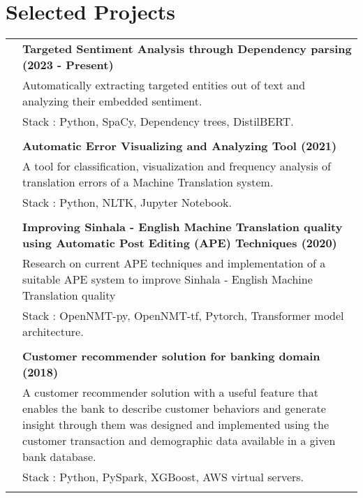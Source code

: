 \documentclass[a4paper,11pt]{article}
\begin{document}
\section{Selected Projects}
\begin{tabular}{r|p{17.5cm}}
\emph{} & \normalsize \bf Targeted Sentiment Analysis through Dependency  parsing (2023 - Present) \textsc{}  \\\textsc{}&\small{Automatically extracting targeted entities out of text and analyzing their embedded sentiment.}\\&\footnotesize{Stack : Python, SpaCy,  Dependency trees, DistilBERT.}\\\multicolumn{2}{c}{} \\

 \emph{} & \normalsize \bf Automatic Error Visualizing and Analyzing Tool (2021) \textsc{}  \\\textsc{}&\small{A tool for classification, visualization and frequency analysis of translation errors of a Machine Translation system.}\\&\footnotesize{Stack : Python, NLTK, Jupyter Notebook.}\\\multicolumn{2}{c}{} \\
 \emph{} & \normalsize \bf Improving Sinhala - English Machine Translation quality using Automatic Post Editing (APE) Techniques (2020)\textsc{}  \\\textsc{}&\small{Research  on current APE techniques and implementation of a suitable APE system to improve Sinhala - English Machine Translation quality}\\&\footnotesize{Stack : OpenNMT-py, OpenNMT-tf, Pytorch, Transformer model architecture.}\\\multicolumn{2}{c}{} \\
 

 \textsc{} & \normalsize \bf Customer recommender solution for banking domain (2018) \\&\small {A customer recommender solution with a useful feature that enables the bank to describe customer behaviors and generate insight through them was designed and implemented using the customer transaction and demographic data available in a given bank database. }\\&\footnotesize{Stack : Python, PySpark, XGBoost, AWS virtual servers.}\\\multicolumn{2}{c}{} \\
 

\end{tabular}
\end{document}
